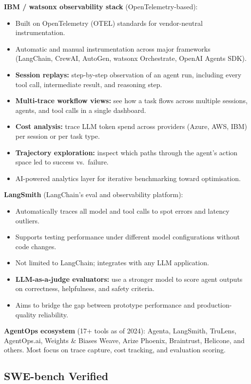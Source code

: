 \textbf{IBM / watsonx observability stack} (OpenTelemetry-based):
\begin{itemize}
  \item Built on OpenTelemetry (OTEL) standards for vendor-neutral instrumentation.
  \item Automatic and manual instrumentation across major frameworks (LangChain,
    CrewAI, AutoGen, watsonx Orchestrate, OpenAI Agents SDK).
  \item \textbf{Session replays:} step-by-step observation of an agent run, including
    every tool call, intermediate result, and reasoning step.
  \item \textbf{Multi-trace workflow views:} see how a task flows across multiple
    sessions, agents, and tool calls in a single dashboard.
  \item \textbf{Cost analysis:} trace LLM token spend across providers (Azure, AWS,
    IBM) per session or per task type.
  \item \textbf{Trajectory exploration:} inspect which paths through the agent's
    action space led to success vs.\ failure.
  \item AI-powered analytics layer for iterative benchmarking toward optimisation.
\end{itemize}

\textbf{LangSmith} (LangChain's eval and observability platform):
\begin{itemize}
  \item Automatically traces all model and tool calls to spot errors and latency
    outliers.
  \item Supports testing performance under different model configurations without
    code changes.
  \item Not limited to LangChain; integrates with any LLM application.
  \item \textbf{LLM-as-a-judge evaluators:} use a stronger model to score agent
    outputs on correctness, helpfulness, and safety criteria.
  \item Aims to bridge the gap between prototype performance and production-quality
    reliability.
\end{itemize}

\textbf{AgentOps ecosystem} (17+ tools as of 2024):
Agenta, LangSmith, TruLens, AgentOps.ai, Weights \& Biases Weave, Arize Phoenix,
Braintrust, Helicone, and others. Most focus on trace capture, cost tracking, and
evaluation scoring.

\subsection{SWE-bench Verified}

